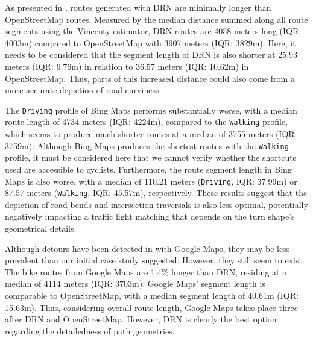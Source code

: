 As presented in , routes generated with DRN are minimally longer than OpenStreetMap routes. Measured by the median distance summed along all route segments using the Vincenty estimator, DRN routes are 4058 meters long (IQR: 4003m) compared to OpenStreetMap with 3907 meters (IQR: 3829m). Here, it needs to be considered that the segment length of DRN is also shorter at 25.93 meters (IQR: 6.76m) in relation to 36.57 meters (IQR: 10.62m) in OpenStreetMap. Thus, parts of this increased distance could also come from a more accurate depiction of road curviness. 

The \texttt{Driving} profile of Bing Maps performs substantially worse, with a median route length of 4734 meters (IQR: 4224m), compared to the \texttt{Walking} profile, which seems to produce much shorter routes at a median of 3755 meters (IQR: 3759m). Although Bing Maps produces the shortest routes with the \texttt{Walking} profile, it must be considered here that we cannot verify whether the shortcuts used are accessible to cyclists. Furthermore, the route segment length in Bing Maps is also worse, with a median of 110.21 meters (\texttt{Driving}, IQR: 37.99m) or 87.57 meters (\texttt{Walking}, IQR: 45.57m), respectively. These results suggest that the depiction of road bends and intersection traversals is also less optimal, potentially negatively impacting a traffic light matching that depends on the turn shape's geometrical details. 

Although detours have been detected in  with Google Maps, they may be less prevalent than our initial case study suggested. However, they still seem to exist. The bike routes from Google Maps are 1.4\% longer than DRN, residing at a median of 4114 meters (IQR: 3703m). Google Maps' segment length is comparable to OpenStreetMap, with a median segment length of 40.61m (IQR: 15.63m). Thus, considering overall route length, Google Maps takes place three after DRN and OpenStreetMap. However, DRN is clearly the best option regarding the detailedness of path geometries.

